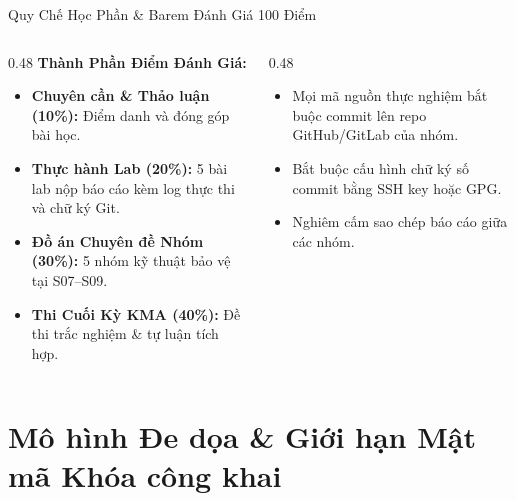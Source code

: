 \begin{frame}{Quy Chế Học Phần \& Barem Đánh Giá 100 Điểm}
  \begin{columns}[T]
    \begin{column}{0.48\textwidth}
      \textbf{Thành Phần Điểm Đánh Giá:}
      \begin{itemize}\small
        \item \textbf{Chuyên cần \& Thảo luận (10\%):} Điểm danh và đóng góp bài học.
        \item \textbf{Thực hành Lab (20\%):} 5 bài lab nộp báo cáo kèm log thực thi và chữ ký Git.
        \item \textbf{Đồ án Chuyên đề Nhóm (30\%):} 5 nhóm kỹ thuật bảo vệ tại S07--S09.
        \item \textbf{Thi Cuối Kỳ KMA (40\%):} Đề thi trắc nghiệm \& tự luận tích hợp.
      \end{itemize}
    \end{column}
    \begin{column}{0.48\textwidth}
      \begin{quizbox}
        \begin{itemize}\small
          \item Mọi mã nguồn thực nghiệm bắt buộc commit lên repo GitHub/GitLab của nhóm.
          \item Bắt buộc cấu hình chữ ký số commit bằng SSH key hoặc GPG.
          \item Nghiêm cấm sao chép báo cáo giữa các nhóm.
        \end{itemize}
      \end{quizbox}
    \end{column}
  \end{columns}
\end{frame}

\section{Mô hình Đe dọa \& Giới hạn Mật mã Khóa công khai}

